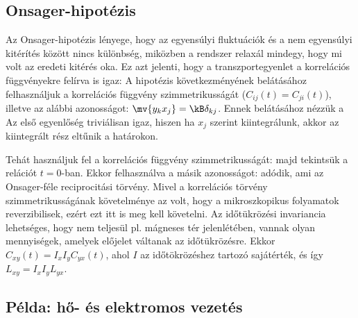   \subsection{Onsager-hipotézis}
   
   Az Onsager-hipotézis lényege, hogy az egyensúlyi fluktuációk és a nem egyensúlyi kitérítés között nincs különbség, miközben a rendszer relaxál mindegy, hogy mi volt az eredeti kitérés oka.
   Ez azt jelenti, hogy a transzportegyenlet a korrelációs függvényekre felírva is igaz:
   A hipotézis következményének belátásához felhasználjuk a korrelációs függvény szimmetrikusságát ($C_{ij}(t)=C_{ji}(t)$), illetve az alábbi azonosságot: $\mv{y_k x_j}=\kB\delta_{kj}$.
   Ennek belátásához nézzük a 
   Az első egyenlőség triviálisan igaz, hiszen ha $x_j$ szerint kiintegrálunk, akkor az kiintegrált rész eltűnik a határokon. 
   
   Tehát használjuk fel a korrelációs függvény szimmetrikusságát:
   majd tekintsük a relációt $t=0$-ban.
   Ekkor felhasználva a másik azonosságot:
   adódik, ami az Onsager-féle reciprocitási törvény.
   Mivel a korrelációs törvény szimmetrikusságának követelménye az volt, hogy a mikroszkopikus folyamatok reverzibilisek, ezért ezt itt is meg kell követelni.
   Az időtükrözési invariancia lehetséges, hogy nem teljesül pl. mágneses tér jelenlétében, vannak olyan mennyiségek, amelyek előjelet váltanak az időtükrözésre.
   Ekkor $C_{xy}(t)=I_x I_y C_{yx}(t)$, ahol $I$ az időtökrözéshez tartozó sajátérték, és így $L_{xy}=I_x I_y L_{yx}$.
   
  \subsection{Példa: hő- és elektromos vezetés}
   
